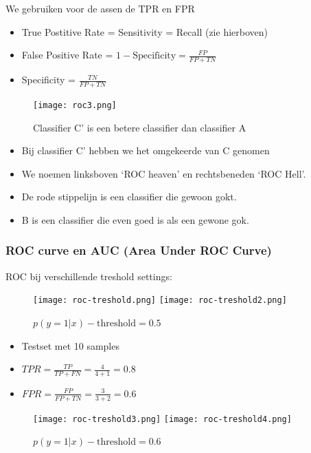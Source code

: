 \documentclass{article}
\begin{document}
We gebruiken voor de assen de TPR en FPR

\begin{itemize}
    \item True Postitive Rate = Sensitivity = Recall (zie hierboven)
    \item False Positive Rate = $1 - \text{Specificity} = \frac{FP}{FP + TN}$
    \item Specificity = $\frac{TN}{FP + TN}$
\end{itemize}

\begin{figure}[H]
    \centering
    \texttt{[image: roc3.png]}
    \caption{Classifier C' is een betere classifier dan classifier A}
\end{figure}

\begin{itemize}
    \item Bij classifier C' hebben we het omgekeerde van C genomen
    \item We noemen linksboven `ROC heaven' en rechtsbeneden `ROC Hell'.
    \item De rode stippelijn is een classifier die gewoon gokt.
    \item B is een classifier die even goed is als een gewone gok.
\end{itemize}


\subsubsection{ROC curve en AUC (Area Under ROC Curve)}

ROC bij verschillende treshold settings: 

\begin{figure}[H]
    \centering
    \texttt{[image: roc-treshold.png]}
    \texttt{[image: roc-treshold2.png]}
    \caption{$p(y=1 | x) - \text{threshold} = 0.5$ }
\end{figure}

\begin{itemize}
    \item Testset met 10 samples
    \item $TPR = \frac{TP}{TP + FN} = \frac{4}{4 + 1} = 0.8$
    \item $FPR = \frac{FP}{FP + TN} = \frac{3}{3 + 2} = 0.6$
\end{itemize}

\begin{figure}[H]
    \centering
    \texttt{[image: roc-treshold3.png]}
    \texttt{[image: roc-treshold4.png]}
    \caption{$p(y=1 | x) - \text{threshold} = 0.6$ }
\end{figure}
\end{document}
